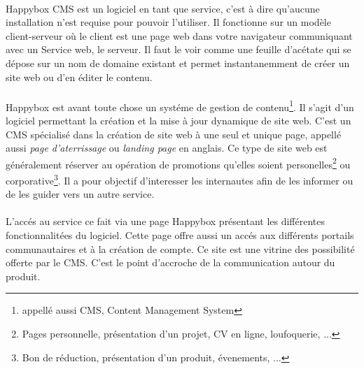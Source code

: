\documentclass[11pt, a4paper ]{report}
\begin{document}
\paragraph{}
Happybox CMS est un logiciel en tant que service, c'est à dire qu'aucune installation n'est requise pour pouvoir l'utiliser. Il fonctionne sur un modèle client-serveur où le client est une page web dans votre navigateur communiquant avec un Service web, le serveur. Il faut le voir comme une feuille d'acétate qui se dépose sur un nom de domaine existant et permet instantanemment de créer un site web ou d'en éditer le contenu.


	\paragraph{}
Happybox est avant toute chose un systéme de gestion de contenu\footnote{appellé aussi CMS, Content Management System}. Il s'agit d'un logiciel permettant la création et la mise à jour dynamique de site web. 
C'est un CMS spécialisé dans la création de site web à une seul et unique page, appellé aussi \emph{page d'aterrissage} ou \emph{landing page} en anglais. Ce type de site web est généralement réserver au opération de promotions qu'elles soient personelles\footnote{Pages personnelle, présentation d'un projet, CV en ligne, loufoquerie, ...} ou corporative\footnote{Bon de réduction, présentation d'un produit, évenements, ...}. Il a pour objectif d'interesser les internautes afin de les informer ou de les guider vers un autre service.



\paragraph{}
L'accés au service ce fait via une page Happybox présentant les différentes fonctionnalitées du logiciel. Cette page offre aussi un accés aux différents portails communautaires et à la création de compte. Ce site est une vitrine des possibilité offerte par le CMS. C'est le point d'accroche de la communication autour du produit.

\end{document}
